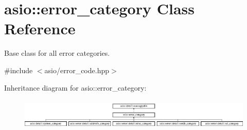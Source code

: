 \hypertarget{classasio_1_1error__category}{}\section{asio\+:\+:error\+\_\+category Class Reference}
\label{classasio_1_1error__category}


Base class for all error categories.  




{\ttfamily \#include $<$asio/error\+\_\+code.\+hpp$>$}

Inheritance diagram for asio\+:\+:error\+\_\+category\+:\begin{figure}[H]
\begin{center}
\leavevmode
\includegraphics[height=1.500000cm]{classasio_1_1error__category}
\end{center}
\end{figure}
